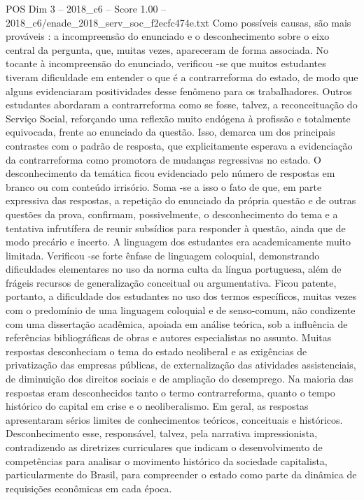 \begin{textsample}{POS Dim 3 – 2018\_c6 – Score 1.00 – 2018\_c6/enade\_2018\_serv\_soc\_f2ecfc474e.txt}
Como possíveis causas, são mais prováveis : a incompreensão do enunciado e o desconhecimento sobre o eixo central da pergunta, que, muitas vezes, apareceram de forma associada.
No tocante à incompreensão do enunciado, verificou -se que muitos estudantes tiveram dificuldade em entender o que é a contrarreforma do estado, de modo que alguns evidenciaram positividades desse fenômeno para os trabalhadores.
Outros estudantes abordaram a contrarreforma como se fosse, talvez, a reconceituação do Serviço Social, reforçando uma reflexão muito endógena à profissão e totalmente equivocada, frente ao enunciado da questão.
Isso, demarca um dos principais contrastes com o padrão de resposta, que explicitamente esperava a evidenciação da contrarreforma como promotora de mudanças regressivas no estado.
O desconhecimento da temática ficou evidenciado pelo número de respostas em branco ou com conteúdo irrisório.
Soma -se a isso o fato de que, em parte expressiva das respostas, a repetição do enunciado da própria questão e de outras questões da prova, confirmam, possivelmente, o desconhecimento do tema e a tentativa infrutífera de reunir subsídios para responder à questão, ainda que de modo precário e incerto.
A linguagem dos estudantes era academicamente muito limitada.
Verificou -se forte ênfase de linguagem coloquial, demonstrando dificuldades elementares no uso da norma culta da língua portuguesa, além de frágeis recursos de generalização conceitual ou argumentativa.
Ficou patente, portanto, a dificuldade dos estudantes no uso dos termos específicos, muitas vezes com o predomínio de uma linguagem coloquial e de senso-comum, não condizente com uma dissertação acadêmica, apoiada em análise teórica, sob a influência de referências bibliográficas de obras e autores especialistas no assunto.
Muitas respostas desconheciam o tema do estado neoliberal e as exigências de privatização das empresas públicas, de externalização das atividades assistenciais, de diminuição dos direitos sociais e de ampliação do desemprego.
Na maioria das respostas eram desconhecidos tanto o termo contrarreforma, quanto o tempo histórico do capital em crise e o neoliberalismo.
Em geral, as respostas apresentaram sérios limites de conhecimentos teóricos, conceituais e históricos.
Desconhecimento esse, responsável, talvez, pela narrativa impressionista, contradizendo as diretrizes curriculares que indicam o desenvolvimento de competências para analisar o movimento histórico da sociedade capitalista, particularmente do Brasil, para compreender o estado como parte da dinâmica de requisições econômicas em cada época.

\end{textsample}
